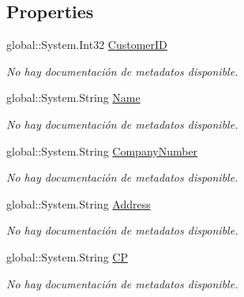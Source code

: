 \subsection*{Properties}
\begin{DoxyCompactItemize}
\item 
global\-::\-System.\-Int32 \hyperlink{class_game_memory_1_1_customers_a7b78aa9b1df1d99f6a58dbf25abc0590}{Customer\-I\-D}
\begin{DoxyCompactList}\small\item\em No hay documentación de metadatos disponible. \end{DoxyCompactList}\item 
global\-::\-System.\-String \hyperlink{class_game_memory_1_1_customers_a12723ccfb832e49e423f8c03b61c5426}{Name}
\begin{DoxyCompactList}\small\item\em No hay documentación de metadatos disponible. \end{DoxyCompactList}\item 
global\-::\-System.\-String \hyperlink{class_game_memory_1_1_customers_a62e5b08d21d78953b35d3b2fefd833ba}{Company\-Number}
\begin{DoxyCompactList}\small\item\em No hay documentación de metadatos disponible. \end{DoxyCompactList}\item 
global\-::\-System.\-String \hyperlink{class_game_memory_1_1_customers_a40d18d70faff8547ca6ed5739ae1ae6d}{Address}
\begin{DoxyCompactList}\small\item\em No hay documentación de metadatos disponible. \end{DoxyCompactList}\item 
global\-::\-System.\-String \hyperlink{class_game_memory_1_1_customers_ad3e8ea3edca56d457e165112a75a27df}{C\-P}
\begin{DoxyCompactList}\small\item\em No hay documentación de metadatos disponible. \end{DoxyCompactList}\item 

\end{DoxyCompactItemize}
